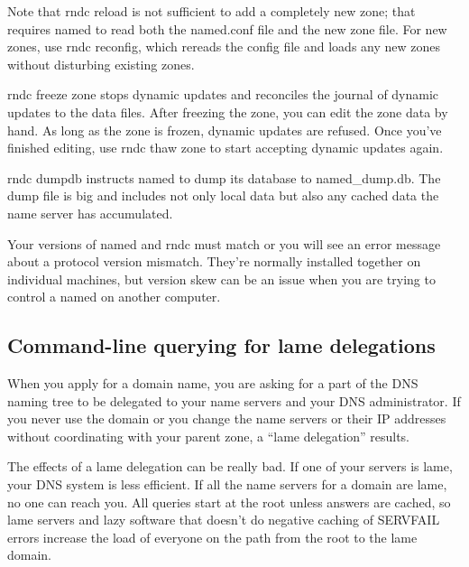 Note that {rndc} {reload} is not sufficient to add a completely new
zone; that requires {named} to read both the {named.conf} file and the
new zone file. For new zones, use {rndc reconfig}, which rereads the
config file and loads any new zones without disturbing existing zones.

{rndc} {freeze} {zone} stops dynamic updates and reconciles the journal
of dynamic
\protect\hypertarget{part0024_split_071.htmlux5cux23_idIndexMarker2294}{}{}updates
to the data files. After freezing the zone, you can edit the zone data
by hand. As long as the zone is frozen, dynamic updates are refused.
Once you've finished editing, use {rndc thaw} {zone} to start accepting
dynamic updates again.

{rndc dumpdb} instructs {named} to dump its database to
{named\_dump.db}. The dump file is big and includes not only local data
but also any cached data the name server has accumulated.

Your versions of {named} and {rndc} must match or you will see an error
message about a protocol version mismatch. They're normally installed
together on individual machines, but version skew can be an issue when
you are trying to control a {named} on another computer.


\subsection{Command-line querying for lame delegations}
\label{sec:lame-delegations}

\protect\hypertarget{part0024_split_072.htmlux5cux23_idIndexMarker2295}{}{}\protect\hypertarget{part0024_split_072.htmlux5cux23_idIndexMarker2296}{}{}When
you apply for a domain name, you are asking for a part of the DNS naming
tree to be delegated to your name servers and your DNS administrator. If
you never use the domain or you change the name servers or their IP
addresses without coordinating with your parent zone, a ``lame
delegation'' results.

The effects of a lame delegation can be really bad. If one of your
servers is lame, your DNS system is less efficient. If all the name
servers for a domain are lame, no one can reach you. All queries start
at the root unless answers are cached, so lame servers and lazy software
that doesn't do negative caching of
\protect\hypertarget{part0024_split_072.htmlux5cux23_idIndexMarker2297}{}{}SERVFAIL
errors increase the load of everyone on the path from the root to the
lame domain.

